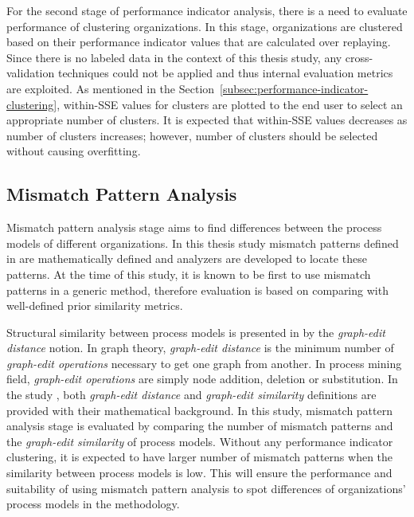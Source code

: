For the second stage of performance indicator analysis, there is a need to evaluate performance of clustering organizations. In this stage, organizations are clustered  based on their performance indicator values that are calculated over replaying. Since there is no labeled data in the context of this thesis study, any cross-validation techniques could not be applied and thus internal evaluation metrics are exploited. As mentioned in the Section~\ref{subsec:performance-indicator-clustering}, within-SSE values for clusters are plotted to the end user to select an appropriate number of clusters. It is expected that within-SSE values decreases as number of clusters increases; however, number of clusters should be selected without causing overfitting.

\subsection{Mismatch Pattern Analysis}
\label{subsec:mismatch-pattern-analysis-eval}
Mismatch pattern analysis stage aims to find differences between the process models of different organizations. In this thesis study mismatch patterns defined in \cite{dijkman2007mismatch} are mathematically defined and analyzers are developed to locate these patterns. At the time of this study, it is known to be first to use mismatch patterns in a generic method, therefore evaluation is based on comparing with well-defined prior similarity metrics.

Structural similarity between process models is presented in \cite{dijkman2011similarity} by the \textit{graph-edit distance} notion. In graph theory, \textit{graph-edit distance} is the minimum number of \textit{graph-edit operations} necessary to get one graph from another. In process mining field, \textit{graph-edit operations} are simply node addition, deletion or substitution. In the study \cite{dijkman2011similarity}, both \textit{graph-edit distance} and \textit{graph-edit similarity} definitions are provided with their mathematical background. In this study, mismatch pattern analysis stage is evaluated by comparing the number of mismatch patterns and the \textit{graph-edit similarity} of process models. Without any performance indicator clustering, it is expected to have larger number of mismatch patterns when the similarity between process models is low. This will ensure the performance and suitability of using mismatch pattern analysis to spot differences of organizations' process models in the methodology.
